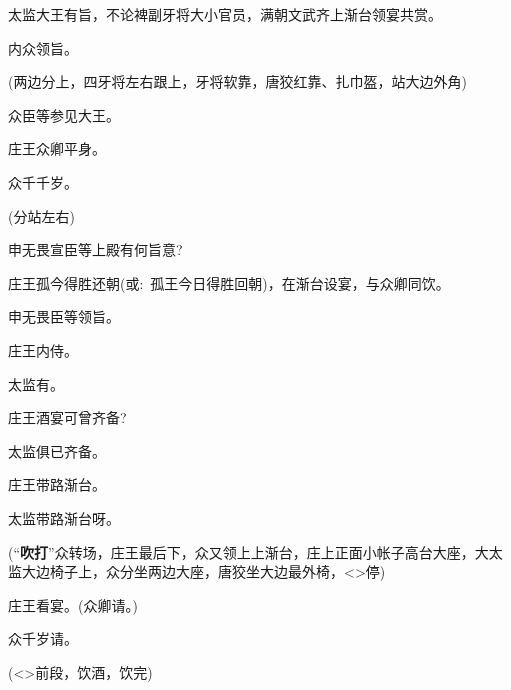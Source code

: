 {太监\hspace{30pt}大王有旨，不论裨副牙将大小官员，满朝文武齐上渐台领宴共赏。

内众\hspace{30pt}领旨。

({\hwfs 两边分上}，{\hwfs 四}牙将{\hwfs 左右跟上}，牙将软靠，唐狡红靠、扎巾盔，{\hwfs 站大边外角})

众\hspace{40pt}臣等参见大王。

庄王\hspace{30pt}众卿平身。

众\hspace{40pt}千千岁。

({\hwfs 分站左右})

申无畏\hspace{20pt}宣臣等上殿有何旨意?

庄王\hspace{30pt}孤今得胜还朝({\akai 或}:~孤王今日得胜回朝)，在渐台设宴，与众卿同饮。

申无畏\hspace{20pt}臣等领旨。

庄王\hspace{30pt}内侍。

太监\hspace{30pt}有。

庄王\hspace{30pt}酒宴可曾齐备?

太监\hspace{30pt}俱已齐备。

庄王\hspace{30pt}带路渐台。

太监\hspace{30pt}带路渐台呀。

\vspace{3pt}{\centerline{{[}连场第二场{]}}}\vspace{5pt}

(``{\bfseries\akai 吹打}''众{\hwfs 转场}，庄王{\hwfs 最后下}，众{\hwfs 又领上上渐台}，庄上{\hwfs 正面小帐子高台大座}，大太监{\hwfs 大边椅子上}，众{\hwfs 分坐两边大座}，{\hwfs 唐狡坐大边最外椅}，\textless{}\!\textgreater{}{\hwfs 停})

庄王\hspace{30pt}看宴。(众卿请。)

众\hspace{40pt}千岁请。

(\textless{}\!\textgreater{}前段，{\hwfs 饮酒}，{\hwfs 饮完})

}

